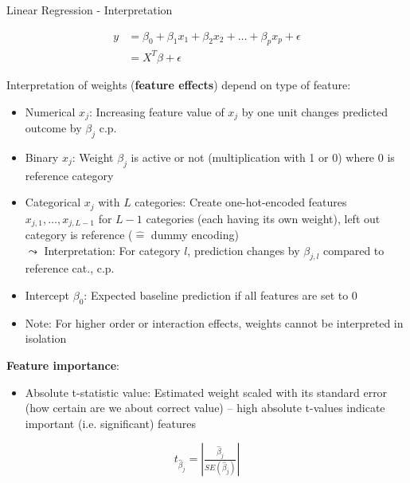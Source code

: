 \documentclass[11pt,compress,t,notes=noshow, aspectratio=169, xcolor=table]{beamer}
\begin{document}
\begin{frame}[c]{Linear Regression - Interpretation}

\begin{align*}
y &= \beta_0 + \beta_1 x_1 + \beta_2 x_2 + \dots + \beta_p x_p + \epsilon \\
 &= X^T\beta + \epsilon
\end{align*}

    Interpretation of weights (\textbf{feature effects}) depend on type of feature:
    \begin{itemize}
        \item Numerical $x_j$: Increasing feature value of $x_j$ by one unit changes predicted outcome by $\beta_j$ c.p.
        \pause
        \item Binary $x_j$: Weight $\beta_j$ is active or not (multiplication with 1 or 0) where 0 is reference category
        \item %
        Categorical $x_j$ with $L$ categories: Create one-hot-encoded features $x_{j,1}, \hdots, x_{j,L-1}$ for $L-1$ categories (each having its own weight), left out category is reference ($\hat =$ dummy encoding)\\
        $\leadsto$ Interpretation:
        For category $l$, prediction changes by $\beta_{j,l}$ compared to reference cat.,  c.p.\pause
        \item Intercept $\beta_0$: Expected baseline prediction if all features are set to 0 %
        \item Note: For higher order or interaction effects, weights cannot be interpreted in isolation
    \end{itemize}	
    \pause
    \textbf{Feature importance}:
    \begin{itemize}
        \item Absolute t-statistic value: Estimated weight scaled with its standard error (how certain are we about correct value) -- high absolute t-values indicate important (i.e. significant) features
    \end{itemize}
    $$t_{\hat\beta_j} = \left| \tfrac{\hat\beta_j}{SE(\hat\beta_j)} \right|$$
\end{frame}
\end{document}
